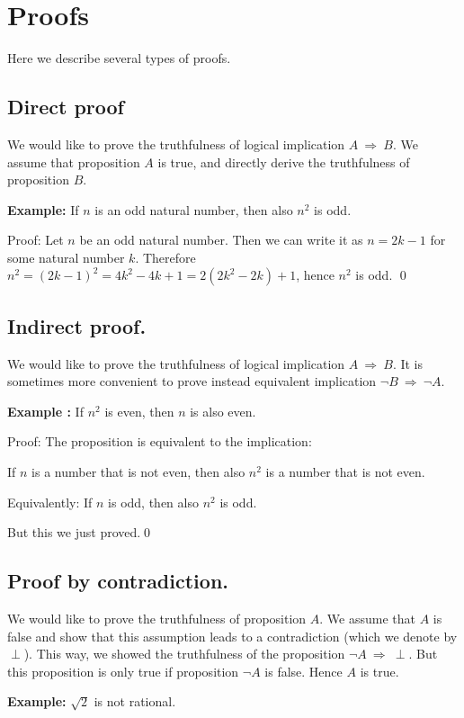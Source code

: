 \documentclass[11pt,paper=b5,footinclude,headinclude]{scrbook} %
\def\sledi {{~\Rightarrow~}}
\theoremstyle{remark}
\theoremstyle{definition} %
\theoremstyle{theorem} %
\begin{document}
\section{Proofs}
Here we describe several types of proofs.
\subsection{Direct proof}

We would like to prove the truthfulness of logical implication $A \sledi  B$.
We assume that proposition $A$ is true, and directly derive the truthfulness of proposition $B$.


\medskip
\textbf{ Example:}
If $n$ is an odd natural number, then also $n^2$ is odd.

Proof: Let $n$ be an odd natural number.
Then we can write it as $n = 2k-1$ for some natural number $k$.
Therefore $n^2 = (2k-1)^2 = 4k^2-4k+1 = 2(2k^2-2k)+1$, hence  $n^2$ is odd. \qed

\subsection{Indirect proof.}

We would like to prove the truthfulness of  logical implication $A \sledi  B$. It is sometimes more convenient to
prove instead equivalent implication $\neg B \sledi \neg A$.

\medskip
\textbf{ Example :} If  $n^2$ is even, then $n$ is also even.

Proof: The proposition is equivalent to the implication:

If $n$ is a number that is not even, then also $n^2$ is a number that is not even.

Equivalently: If $n$ is odd, then also $n^2$ is odd.

But this we just proved.\qed

\subsection{Proof by contradiction.}

We would like to prove the truthfulness of proposition $A$.
We assume that $A$ is false and show that this assumption leads to a contradiction (which we denote by $\perp$).
This way, we showed the truthfulness of the proposition $\neg A \sledi \perp$. But this proposition is only true if proposition $\neg A$ is false. Hence $A$ is true.

\medskip
\textbf{ Example:} $\sqrt 2$ is not rational.
\end{document}
